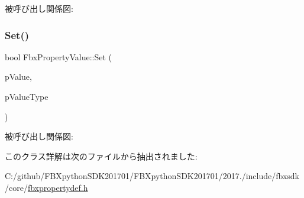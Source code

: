 被呼び出し関係図\+:
\mbox{\label{class_fbx_property_value_a619bc0993f915fced412d4c78c739769}} 
\subsubsection{\texorpdfstring{Set()}{Set()}}
{\footnotesize\ttfamily bool Fbx\+Property\+Value\+::\+Set (\begin{DoxyParamCaption}\item[{const void $\ast$}]{p\+Value,  }\item[{\hyperlink{fbxpropertytypes_8h_a73913a5ddfb20e57c6f25e9e6784bd92}{E\+Fbx\+Type}}]{p\+Value\+Type }\end{DoxyParamCaption})}

被呼び出し関係図\+:


このクラス詳解は次のファイルから抽出されました\+:\begin{DoxyCompactItemize}
\item 
C\+:/github/\+F\+B\+Xpython\+S\+D\+K201701/\+F\+B\+Xpython\+S\+D\+K201701/2017./include/fbxsdk/core/\hyperlink{fbxpropertydef_8h}{fbxpropertydef.\+h}\end{DoxyCompactItemize}
